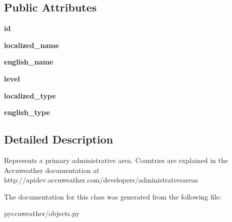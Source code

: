 \subsection*{Public Attributes}
\begin{DoxyCompactItemize}
\item 
\hypertarget{classpyccuweather_1_1objects_1_1_administrative_area_aac1366c9c319b1f5bd29f1462d11908a}{}{\bfseries id}\label{classpyccuweather_1_1objects_1_1_administrative_area_aac1366c9c319b1f5bd29f1462d11908a}

\item 
\hypertarget{classpyccuweather_1_1objects_1_1_administrative_area_ae6387b8697e0c131244f2723c182a9a4}{}{\bfseries localized\+\_\+name}\label{classpyccuweather_1_1objects_1_1_administrative_area_ae6387b8697e0c131244f2723c182a9a4}

\item 
\hypertarget{classpyccuweather_1_1objects_1_1_administrative_area_ac68e966ae1fef389f04ed777fb6dbfed}{}{\bfseries english\+\_\+name}\label{classpyccuweather_1_1objects_1_1_administrative_area_ac68e966ae1fef389f04ed777fb6dbfed}

\item 
\hypertarget{classpyccuweather_1_1objects_1_1_administrative_area_a0d8c5202b19824d2c280868c22c027c0}{}{\bfseries level}\label{classpyccuweather_1_1objects_1_1_administrative_area_a0d8c5202b19824d2c280868c22c027c0}

\item 
\hypertarget{classpyccuweather_1_1objects_1_1_administrative_area_a3e92d8a22d8cc63a105933cc4fa3cbc2}{}{\bfseries localized\+\_\+type}\label{classpyccuweather_1_1objects_1_1_administrative_area_a3e92d8a22d8cc63a105933cc4fa3cbc2}

\item 
\hypertarget{classpyccuweather_1_1objects_1_1_administrative_area_a3d6b44091e48f19da021c2d9564d2c29}{}{\bfseries english\+\_\+type}\label{classpyccuweather_1_1objects_1_1_administrative_area_a3d6b44091e48f19da021c2d9564d2c29}

\end{DoxyCompactItemize}


\subsection{Detailed Description}
\begin{DoxyVerb}Represents a primary administrative area.
Countries are explained in the Accuweather documentation at http://apidev.accuweather.com/developers/administrativeareas
\end{DoxyVerb}
 

The documentation for this class was generated from the following file\+:\begin{DoxyCompactItemize}
\item 
pyccuweather/objects.\+py\end{DoxyCompactItemize}
